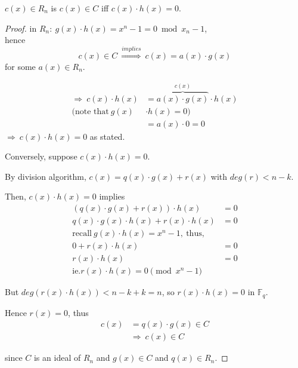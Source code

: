 \documentclass{article}
\theoremstyle{definition}
\newenvironment{thm}[1]
{\renewcommand\theinnerthm{#1}\innerthm}
{\endinnerthm}
\begin{document}
\begin{thm}{12.14} \label{12.14}
  $c(x) \in R_n$ is $c(x) \in C$ iff $c(x) \cdot h(x) =0$.
\end{thm}
\begin{proof}
  in $R_n: ~ g(x) \cdot h(x) = x^n -1 = 0 \bmod{x_n -1}$,\\
  hence
  $$c(x) \in C ~\stackrel{implies}{\Longrightarrow}~ c(x) = a(x) \cdot g(x)$$
  for some $a(x) \in R_n$.

  \begin{align*}
    \Longrightarrow~ c(x) \cdot h(x) &= \overbrace{a(x) \cdot g(x)}^{c(x)} \cdot h(x)\\
    (\text{note that}~ g(x) &\cdot h(x)=0)\\
                                     &= a(x) \cdot 0 = 0
  \end{align*}
  $\Longrightarrow~ c(x) \cdot h(x) = 0$ as stated.


  \vspace{0.6cm}
  Conversely, suppose $c(x) \cdot h(x) = 0$.

  By division algorithm, $c(x) = q(x) \cdot g(x) + r(x)$ with $deg(r) < n-k$.

  Then, $c(x) \cdot h(x) = 0$ implies
  \begin{align*}
    (q(x) \cdot g(x) + r(x)) \cdot h(x) &= 0\\
    q(x) \cdot g(x) \cdot h(x) + r(x) \cdot h(x) &= 0\\
    \text{recall}~ g(x)\cdot h(x) = x^n -1,~ \text{thus,}&\\
    0 + r(x) \cdot h(x) &=0\\
    r(x) \cdot h(x) &= 0\\
    \text{ie.} r(x) \cdot h(x) = 0 \pmod{x^n-1}
  \end{align*}

  But $deg(r(x) \cdot h(x)) < n-k +k = n$, so $r(x) \cdot h(x)= 0$ in $\mathbb{F}_q$.

  Hence $r(x)=0$, thus
  \begin{align*}
    c(x) &= q(x) \cdot g(x) \in C\\
         &\Longrightarrow~ c(x) \in C
  \end{align*}

  since $C$ is an ideal of $R_n$ and $g(x) \in C$ and $q(x) \in R_n$.
\end{proof}
\end{document}
